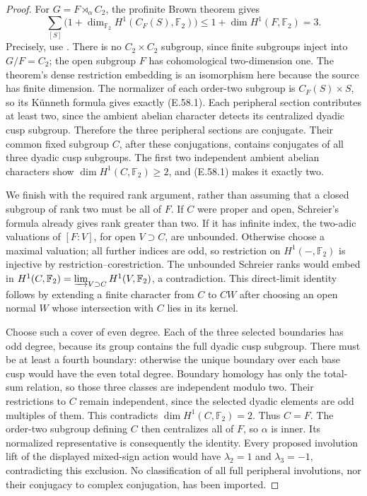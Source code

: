 \begin{proof}
For \(G=F\rtimes_\alpha C_2\), the profinite Brown theorem gives
\[
 \sum_{[S]}\bigl(1+\dim_{\mathbb F_2}H^1(C_F(S),\mathbb F_2)\bigr)
 \le 1+\dim H^1(F,\mathbb F_2)=3. \tag{E.58.1}
\]
Precisely, use \citet[Theorem 2 and \S1.1, equations(1)--(6),
author pp.~3--4]{SymKochloukovaZalesskii2007}. There is no
\(C_2\times C_2\) subgroup, since finite subgroups inject into
\(G/F=C_2\); the open subgroup \(F\) has cohomological
two-dimension one. The theorem's dense restriction embedding is an
isomorphism here because the source has finite dimension. The
normalizer of each order-two subgroup is \(C_F(S)\times S\),
so its K\"unneth formula gives exactly (E.58.1).
Each peripheral section contributes at least two, since the ambient
abelian character detects its centralized dyadic cusp subgroup.
Therefore the three peripheral sections are conjugate. Their common
fixed subgroup \(C\), after these conjugations, contains conjugates
of all three dyadic cusp subgroups. The first two independent ambient
abelian characters show \(\dim H^1(C,\mathbb F_2)\ge2\), and
(E.58.1) makes it exactly two.

We finish with the required rank argument, rather than assuming that
a closed subgroup of rank two must be all of \(F\). If \(C\) were
proper and open, Schreier's formula already gives rank greater than
two. If it has infinite index, the two-adic valuations of
\([F:V]\), for open \(V\supset C\), are unbounded. Otherwise
choose a maximal valuation; all further indices are odd, so
restriction on \(H^1(-,\mathbb F_2)\) is injective by
restriction--corestriction. The unbounded Schreier ranks would embed
in \(H^1(C,\mathbb F_2)=\varinjlim_{V\supset C}H^1(V,\mathbb F_2)\),
a contradiction. This direct-limit identity follows by extending a
finite character from \(C\) to \(CW\) after choosing an open
normal \(W\) whose intersection with \(C\) lies in its kernel.

Choose such a cover of even degree. Each of the three selected
boundaries has odd degree, because its group contains the full
dyadic cusp subgroup. There must be at least a fourth boundary:
otherwise the unique boundary over each base cusp would have the
even total degree. Boundary homology has only the total-sum relation,
so those three classes are independent modulo two. Their restrictions
to \(C\) remain independent, since the selected dyadic elements are
odd multiples of them. This contradicts \(\dim H^1(C,\mathbb F_2)=2\).
Thus \(C=F\). The order-two subgroup defining \(C\) then
centralizes all of \(F\), so \(\alpha\) is inner. Its normalized
representative is consequently the identity.
Every proposed involution lift of the displayed mixed-sign action
would have \(\lambda_2=1\) and \(\lambda_3=-1\), contradicting
this exclusion. No classification of all full peripheral involutions,
nor their conjugacy to complex conjugation, has been imported.
\end{proof}

